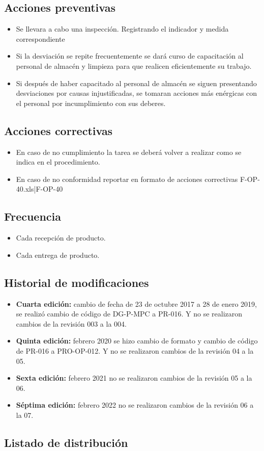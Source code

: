 \subsection{Acciones preventivas}

\begin{itemize}
	\item Se llevara a cabo una inspección. Registrando el indicador y medida correspondiente
	\item Si la desviación se repite frecuentemente se dará curso de capacitación al personal de almacén y limpieza para que realicen eficientemente su trabajo.
	\item Si después de haber capacitado al personal de almacén se siguen presentando desviaciones por causas injustificadas, se tomaran acciones más enérgicas con el personal por incumplimiento con sus deberes.
\end{itemize}

\subsection{Acciones correctivas}

\begin{itemize}
	\item En caso de no cumplimiento la tarea se deberá volver a realizar como se indica en el procedimiento.
	\item En caso de no conformidad reportar en formato de acciones correctivas F-OP-40.xls|F-OP-40
\end{itemize}

\subsection{Frecuencia}

\begin{itemize}
	\item Cada recepción de producto.
	\item Cada entrega de producto.
\end{itemize}

\subsection{Historial de modificaciones}

\begin{itemize}
	\item \textbf{Cuarta edición:} cambio de fecha de 23 de octubre 2017 a 28 de enero 2019, se realizó cambio de código de DG-P-MPC a PR-016. Y no se realizaron cambios de la revisión 003 a la 004.
	\item \textbf{Quinta edición:} febrero 2020 se hizo cambio de formato y cambio de código de PR-016 a PRO-OP-012. Y no se realizaron cambios de la revisión 04 a la 05.
	\item \textbf{Sexta edición:} febrero 2021 no se realizaron cambios de la revisión 05 a la 06.
	\item \textbf{Séptima edición:} febrero 2022 no se realizaron cambios de la revisión 06 a la 07.
\end{itemize}

\subsection{Listado de distribución}

